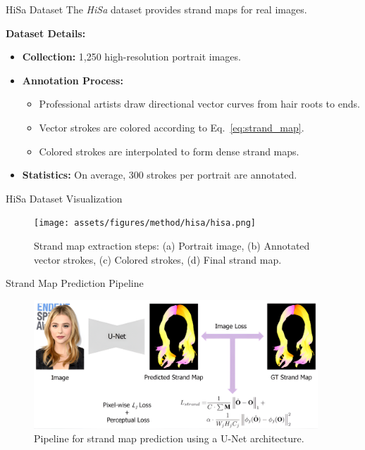 \begin{frame}[t]{HiSa Dataset}
    The \emph{HiSa} dataset provides strand maps for real images.

    \vspace{5pt}

    \textbf{Dataset Details:}
    \begin{itemize}
        \item \textbf{Collection:} 1,250 high-resolution portrait images.
        \item \textbf{Annotation Process:}
        \begin{itemize}
            \item Professional artists draw directional vector curves from hair roots to ends.
            \item Vector strokes are colored according to Eq.~\ref{eq:strand_map}.
            \item Colored strokes are interpolated to form dense strand maps.
        \end{itemize}
        \item \textbf{Statistics:} On average, 300 strokes per portrait are annotated.
    \end{itemize}
\end{frame}

\begin{frame}{HiSa Dataset Visualization}
    \begin{figure}[h]
        \centering
        \texttt{[image: assets/figures/method/hisa/hisa.png]}
        \caption{Strand map extraction steps:
        (a) Portrait image, (b) Annotated vector strokes, (c) Colored strokes, (d) Final strand map.}
        \label{fig:hisa}
    \end{figure}
\end{frame}

\begin{frame}{Strand Map Prediction Pipeline}
    \begin{figure}[h]
        \centering
        \includegraphics[width=0.95\textwidth]{assets/figures/method/strand/prediction.png}
        \caption{Pipeline for strand map prediction using a U-Net architecture.}
        \label{fig:strand-map-prediction}
    \end{figure}
\end{frame}

